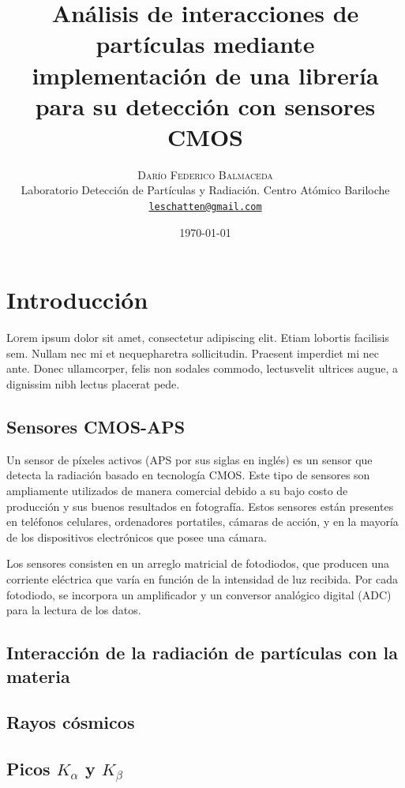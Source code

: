 \documentclass[twoside,twocolumn]{article}
\title{Análisis de interacciones de partículas mediante implementación de una librería para su detección con sensores CMOS}
\author{%
    \textsc{Darío Federico Balmaceda} \\[1ex]     %
    \normalsize Laboratorio Detección de Partículas y Radiación. Centro Atómico Bariloche \\                                    %
    \normalsize \href{mailto:leschatten@gmail.com}{\texttt{leschatten@gmail.com}}                   %
  }
\date{\today}                                                                %
\begin{document}
  
  \maketitle              %
  
  \section{Introducción}
    \lettrine[nindent=0em,lines=3]{L} orem ipsum dolor sit amet, consectetur adipiscing elit.
      Etiam lobortis facilisis sem. Nullam nec mi et nequepharetra sollicitudin.
      Praesent imperdiet mi nec ante. Donec ullamcorper, felis non sodales commodo,
      lectusvelit ultrices augue, a dignissim nibh lectus placerat pede.

    \subsection{Sensores CMOS-APS}
      Un sensor de píxeles activos (APS por sus siglas en inglés) es un sensor que detecta la radiación basado en tecnología CMOS.
      Este tipo de sensores son ampliamente utilizados de manera comercial debido a su
      bajo costo de producción y sus buenos resultados en fotografía.
      Estos sensores están presentes en teléfonos celulares, ordenadores portatiles, cámaras de acción,
      y en la mayoría de los dispositivos electrónicos que posee una cámara.

      Los sensores consisten en un arreglo matricial de fotodiodos, 
      que producen una corriente eléctrica que varía en función de la intensidad de luz recibida.
      Por cada fotodiodo, se incorpora un amplificador y un conversor analógico digital (ADC) para la lectura de los datos.
  

    \subsection{Interacción de la radiación de partículas con la materia}

    \subsection{Rayos cósmicos}
    
    \subsection{Picos $K_{\alpha}$ y $K_{\beta}$}
\end{document}
